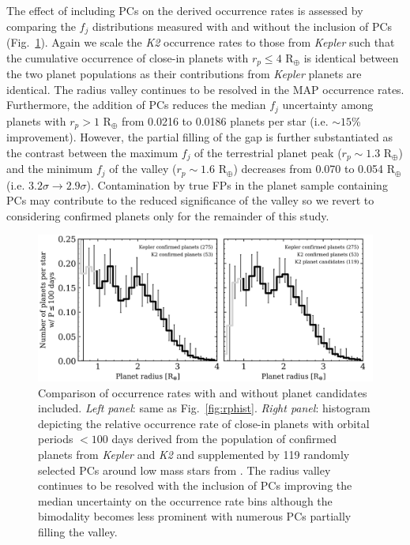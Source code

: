 \documentclass[twocolumn]{emulateapj}
\newcommand{\kepler}[1]{\emph{Kepler}#1}
\newcommand{\ktwo}[1]{\emph{K2}#1}
\begin{document}


The effect of including PCs on the derived occurrence rates is assessed by comparing the $f_j$ distributions
measured with and without the inclusion of PCs (Fig.~\ref{fig:rphistPCs}).
Again we scale the \ktwo{} occurrence rates
to those from \kepler{} such that the cumulative occurrence of close-in planets with $r_p \leq 4$ R$_{\oplus}$
is identical between the two planet populations as their contributions from \kepler{} planets are identical.
The radius valley continues to be resolved in
the MAP occurrence rates. Furthermore, the addition of PCs reduces the median $f_j$ uncertainty among planets
with $r_p>1$ R$_{\oplus}$ from
0.0216 to 0.0186 planets per star (i.e. $\sim 15$\% improvement). However, the partial filling of the gap is
further substantiated as the contrast between the maximum $f_j$ of the terrestrial planet peak ($r_p \sim 1.3$ R$_{\oplus}$)
and the minimum $f_j$ of the valley ($r_p \sim 1.6$ R$_{\oplus}$) decreases from 0.070
to 0.054 R$_{\oplus}$ (i.e. $3.2\sigma \to 2.9\sigma$). Contamination by true FPs in the planet sample containing
PCs may contribute to the reduced significance of the valley so we revert to considering confirmed planets only
for the remainder of this study.


\begin{figure}
  \centering
  \includegraphics[scale=.8]{figures/rphist_kruse.png}
  \caption{Comparison of occurrence rates with and without planet candidates included. \emph{Left panel}:
    same as Fig.~\ref{fig:rphist}. \emph{Right panel}: histogram depicting the relative occurrence
    rate of close-in planets with orbital periods $<100$ days derived from the population of confirmed
    planets from \kepler{} and \ktwo{} and supplemented by 119 randomly selected PCs
    around low mass stars from \cite{kruse19}. The radius valley continues to be resolved with
    the inclusion of PCs improving the median uncertainty on the occurrence rate bins although the
    bimodality becomes less prominent with numerous PCs partially filling the valley.}
  \label{fig:rphistPCs}
\end{figure}
\end{document}
